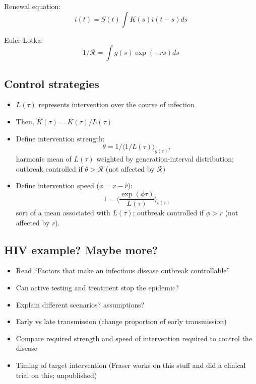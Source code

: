 \documentclass{article}\usepackage[]{graphicx}\usepackage[]{color}
\newcommand{\RR}{\ensuremath{{\mathcal R}}}
\begin{document}
Renewal equation:
\begin{equation}
i(t) = S(t) \int K(s) i(t-s) ds
\end{equation}

Euler-Lotka:
\begin{equation}
1/\RR = \int g(s) \exp(-rs) ds
\end{equation}

\subsection{Control strategies}

\begin{itemize}
	\item $L(\tau)$ represents intervention over the course of infection
	\item Then, $\hat K(\tau) = K(\tau)/L(\tau)$
	\item Define intervention strength:
	$$
	\theta = 1/\langle 1/L(\tau) \rangle_{g(\tau)},
	$$
	harmonic mean of $L(\tau)$ weighted by generation-interval distribution; outbreak controlled if $\theta > \mathcal R$ (not affected by $\RR$)
	\item Define intervention speed ($\phi = r - \hat r$):
	$$
	1 = \langle \frac{\exp(\phi \tau) }{L(\tau)} \rangle_{b(\tau)}
	$$
	sort of a mean associated with $L(\tau)$; outbreak controlled if $\phi > r$ (not affected by $r$).
\end{itemize}

\subsection{HIV example? Maybe more?}

\begin{itemize}
	\item Read ``Factors that make an infectious disease outbreak controllable''
	\item Can active testing and treatment stop the epidemic?
	\item Explain different scenarios? assumptions?
	\item Early vs late transmission (change proportion of early transmission)
	\item Compare required strength and speed of intervention required to control the disease
	\item Timing of target intervention (Fraser works on this stuff and did a clinical trial on this; unpublished)
\end{itemize}
\end{document}
